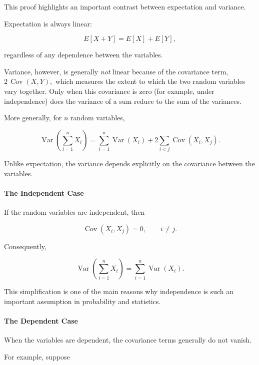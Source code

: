 \documentclass[11pt]{article}
\begin{document}
\begin{mdframed}[
		linewidth=0.8pt,
		roundcorner=6pt,
		backgroundcolor=gray!5,
		linecolor=gray!60,
		innertopmargin=10pt,
		innerbottommargin=10pt,
		innerleftmargin=10pt,
		innerrightmargin=10pt
		]
		This proof highlights an important contrast between expectation and variance.
		
		Expectation is always linear:
		
		\[
		E[X+Y]
		=
		E[X]
		+
		E[Y],
		\]
		
		regardless of any dependence between the variables.
		
		Variance, however, is generally \emph{not} linear because of the covariance term, $	2\,\operatorname{Cov}(X,Y),	$ which measures the extent to which the two random variables vary together.
		Only when this covariance is zero (for example, under independence) does the variance of a sum reduce to the sum of the variances.
		
		More generally, for \(n\) random variables,
		
		\[
		\boxed{
			\operatorname{Var}
			\!\left(
			\sum_{i=1}^{n}X_i
			\right)
			=
			\sum_{i=1}^{n}
			\operatorname{Var}(X_i)
			+
			2
			\sum_{i<j}
			\operatorname{Cov}(X_i,X_j).
		}
		\]
		
		Unlike expectation, the variance depends explicitly on the covariance
		between the variables.
		
		\bigskip
		
		\paragraph{The Independent Case}
		
		If the random variables are independent, then
		
		\[
		\operatorname{Cov}(X_i,X_j)=0,
		\qquad
		i\neq j.
		\]
		
		Consequently,
		
		\[
		\boxed{
			\operatorname{Var}
			\!\left(
			\sum_{i=1}^{n}X_i
			\right)
			=
			\sum_{i=1}^{n}
			\operatorname{Var}(X_i).
		}
		\]
		
		This simplification is one of the main reasons why independence is such an
		important assumption in probability and statistics.
		
		\bigskip
		
		\paragraph{The Dependent Case}
		
		When the variables are dependent, the covariance terms generally do not
		vanish.
		
		For example, suppose
		

\end{mdframed}
\end{document}
